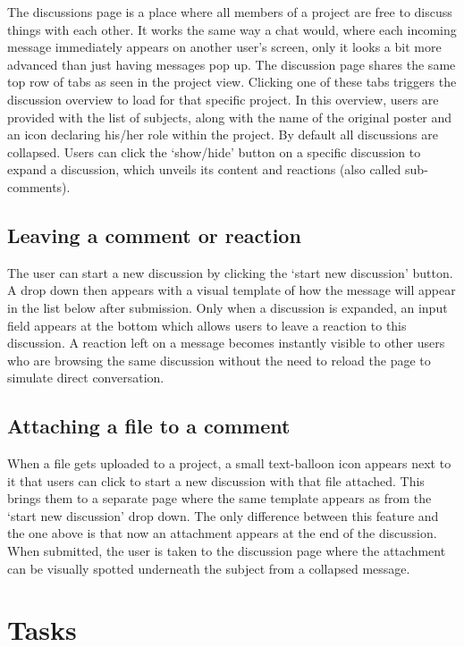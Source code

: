 The discussions page is a place where all members of a project are free to discuss things with each other. It works the same way a chat would, where each incoming message immediately appears on another user's screen, only it looks a bit more advanced than just having messages pop up. The discussion page shares the same top row of tabs as seen in the project view. Clicking one of these tabs triggers the discussion overview to load for that specific project. In this overview, users are provided with the list of subjects, along with the name of the original poster and an icon declaring his/her role within the project. By default all discussions are collapsed. Users can click the `show/hide' button on a specific discussion to expand a discussion, which unveils its content and reactions (also called sub-comments).

\subsection{Leaving a comment or reaction}

The user can start a new discussion by clicking the `start new discussion' button. A drop down then appears with a visual template of how the message will appear in the list below after submission. Only when a discussion is expanded, an input field appears at the bottom which allows users to leave a reaction to this discussion. A reaction left on a message becomes instantly visible to other users who are browsing the same discussion without the need to reload the page to simulate direct conversation.

\subsection{Attaching a file to a comment}

When a file gets uploaded to a project, a small text-balloon icon appears next to it that users can click to start a new discussion with that file attached. This brings them to a separate page where the same template appears as from the `start new discussion' drop down. The only difference between this feature and the one above is that now an attachment appears at the end of the discussion. When submitted, the user is taken to the discussion page where the attachment can be visually spotted underneath the subject from a collapsed message.

\section{Tasks}

